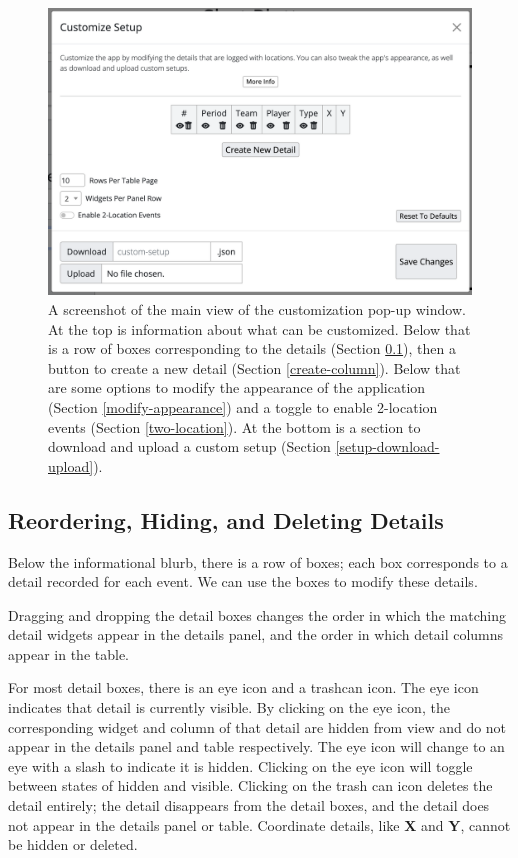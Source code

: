 \documentclass[letterpaper]{article}
\begin{document}
\begin{figure}[h!]
	\centering
	\includegraphics[width=1\linewidth]{images/main-page}
	\caption{A screenshot of the main view of the customization pop-up window. At the top is information about what can be customized. Below that is a row of boxes corresponding to the details (Section \ref{reorder-hide-delete}), then a button to create a new detail (Section \ref{create-column}). Below that are some options to modify the appearance of the application (Section \ref{modify-appearance}) and a toggle to enable 2-location events (Section \ref{two-location}). At the bottom is a section to download and upload a custom setup (Section \ref{setup-download-upload}).}
		\label{fig:main-page}
	\end{figure}

\subsection{Reordering, Hiding, and Deleting Details}\label{reorder-hide-delete}
Below the informational blurb, there is a row of boxes; each box corresponds to a detail recorded for each event. We can use the boxes to modify these details.

Dragging and dropping the detail boxes changes the order in which the matching detail widgets appear in the details panel, and the order in which detail columns appear in the table.

For most detail boxes, there is an eye icon and a trashcan icon. The eye icon indicates that detail is currently visible. By clicking on the eye icon, the corresponding widget and column of that detail are hidden from view and do not appear in the details panel and table respectively.  The eye icon will change to an eye with a slash to indicate it is hidden. Clicking on the eye icon will toggle between states of hidden and visible. Clicking on the trash can icon deletes the detail entirely; the detail disappears from the detail boxes, and the detail does not appear in the details panel or table. Coordinate details, like \textbf{X} and \textbf{Y}, cannot be hidden or deleted.
\end{document}
